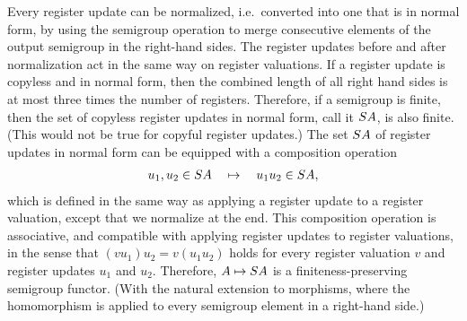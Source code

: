 Every register update can be normalized, i.e.~converted into one that is in normal form, by using the semigroup operation to merge consecutive elements of the output semigroup in the right-hand sides. The  register updates before and after normalization act in the same way on register valuations.   If a register update is copyless and in normal form, then the combined length of all right hand sides is at most three times the number of registers. Therefore, if a semigroup is finite, then the set of copyless register updates in normal form, call it $\functors A$,  is also finite. (This would not be true for copyful register updates.) The set $\functors A$ of register updates in normal form can be equipped with a composition operation 
\begin{align*}
    u_1,u_2 \in \functors A  \quad \mapsto \quad u_1u_2 \in \functors A,
    \end{align*}
which is defined in the same way as applying a register update to a register valuation, except that we normalize at the end. This composition operation is associative, and  compatible with applying register updates to register valuations, in the sense that $(vu_1)u_2 = v(u_1u_2)$ holds for every register valuation $v$ and register updates $u_1$ and $u_2$. Therefore, $A \mapsto \functors A$ is a finiteness-preserving semigroup functor. (With the natural extension to morphisms, where the homomorphism is applied to every semigroup element in a right-hand side.) 


